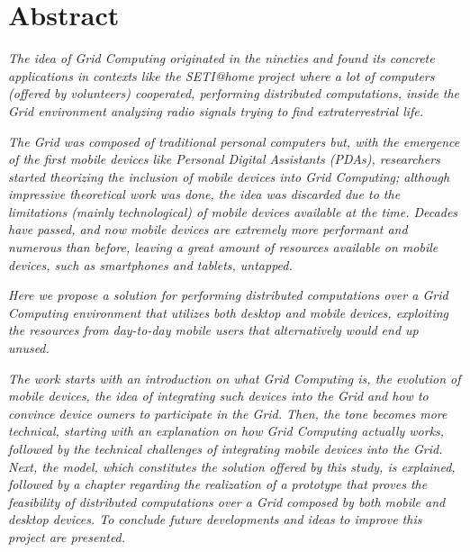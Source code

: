 \chapter*{Abstract}
\begin{spacing}{1.3}
\textit{\small
The idea of Grid Computing originated in the nineties and found its concrete applications in contexts like the SETI@home project where a lot of computers (offered by volunteers) cooperated, performing distributed computations, inside the Grid environment analyzing radio signals trying to find extraterrestrial life.
}\newline

\textit{\small
The Grid was composed of traditional personal computers but, with the emergence of the first mobile devices like Personal Digital Assistants (PDAs), researchers started theorizing the inclusion of mobile devices into Grid Computing; although impressive theoretical work was done, the idea was discarded due to the limitations (mainly technological) of mobile devices available at the time. Decades have passed, and now mobile devices are extremely more performant and numerous than before, leaving a great amount of resources available on mobile devices, such as smartphones and tablets, untapped.
}\newline

\textit{\small
Here we propose a solution for performing distributed computations over a Grid Computing environment that utilizes both desktop and mobile devices, exploiting the resources from day-to-day mobile users that alternatively would end up unused.
}\newline

\textit{\small
The work starts with an introduction on what Grid Computing is, the evolution of mobile devices, the idea of integrating such devices into the Grid and how to convince device owners to participate in the Grid. Then, the tone becomes more technical, starting with an explanation on how Grid Computing actually works, followed by the technical challenges of integrating mobile devices into the Grid. Next, the model, which constitutes the solution offered by this study, is explained, followed by a chapter regarding the realization of a prototype that proves the feasibility of distributed computations over a Grid composed by both mobile and desktop devices. To conclude future developments and ideas to improve this project are presented.
}
\end{spacing}
